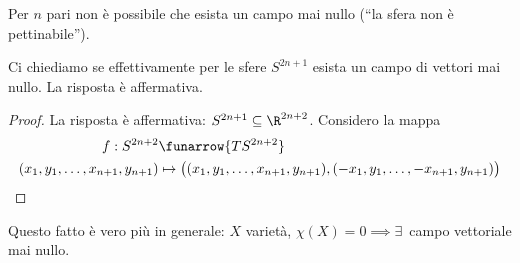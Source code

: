 \begin{cor}
 Per $n$ pari non è possibile che esista un campo mai nullo
 (``la sfera non è pettinabile'').
\end{cor}
\begin{prop}
 Ci chiediamo se effettivamente per le sfere $S^{2n+1}$ esista un campo di vettori mai nullo. La risposta è affermativa.
\end{prop}
\begin{proof}
La risposta è affermativa: $S^{2n+1}\subseteq\R^{2n+2}$. Considero la mappa 
\begin{align*}
 f : S^{2n+2} &\funarrow {TS^{2n+2}} \\
 (x_1, y_1,\dots, x_{n+1}, y_{n+1}) &\mapsto \big((x_1, y_1,\dots, x_{n+1}, y_{n+1}), (-x_1, y_1,\dots, -x_{n+1}, y_{n+1})\big)
\end{align*}


\end{proof}
\begin{oss}
 Questo fatto è vero più in generale: $X$ varietà, $\chi(X)=0\implies \exists$~campo vettoriale mai nullo.
\end{oss}

